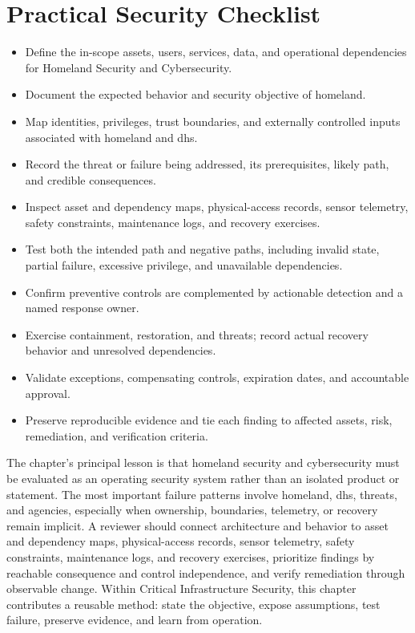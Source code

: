 \documentclass[11pt]{article}
\begin{document}
\section*{Practical Security Checklist}
\begin{itemize}[label=$\square$]
\item Define the in-scope assets, users, services, data, and operational dependencies for Homeland Security and Cybersecurity.
\item Document the expected behavior and security objective of homeland.
\item Map identities, privileges, trust boundaries, and externally controlled inputs associated with homeland and dhs.
\item Record the threat or failure being addressed, its prerequisites, likely path, and credible consequences.
\item Inspect asset and dependency maps, physical-access records, sensor telemetry, safety constraints, maintenance logs, and recovery exercises.
\item Test both the intended path and negative paths, including invalid state, partial failure, excessive privilege, and unavailable dependencies.
\item Confirm preventive controls are complemented by actionable detection and a named response owner.
\item Exercise containment, restoration, and threats; record actual recovery behavior and unresolved dependencies.
\item Validate exceptions, compensating controls, expiration dates, and accountable approval.
\item Preserve reproducible evidence and tie each finding to affected assets, risk, remediation, and verification criteria.
\end{itemize}
\begin{synthesisbox}
The chapter's principal lesson is that homeland security and cybersecurity must be evaluated as an operating security system rather than an isolated product or statement. The most important failure patterns involve homeland, dhs, threats, and agencies, especially when ownership, boundaries, telemetry, or recovery remain implicit. A reviewer should connect architecture and behavior to asset and dependency maps, physical-access records, sensor telemetry, safety constraints, maintenance logs, and recovery exercises, prioritize findings by reachable consequence and control independence, and verify remediation through observable change. Within Critical Infrastructure Security, this chapter contributes a reusable method: state the objective, expose assumptions, test failure, preserve evidence, and learn from operation.
\end{synthesisbox}
\end{document}
